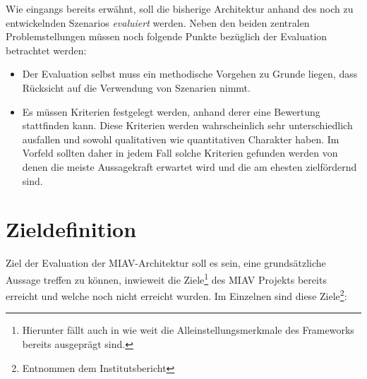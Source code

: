 \documentclass[12pt,headsepline,a4paper,bibtotoc,liststotoc,DIV12,BCOR12mm]{scrartcl}
\begin{document}
  Wie eingangs bereits erwähnt, soll die bisherige Architektur anhand des noch zu entwickelnden Szenarios \emph{evaluiert} werden. Neben den beiden zentralen Problemstellungen müssen noch folgende Punkte bezüglich der Evaluation betrachtet werden:

  \begin{itemize}
    \item Der Evaluation selbst muss ein methodische Vorgehen zu Grunde liegen, dass Rücksicht auf die Verwendung von Szenarien nimmt.
    \item Es müssen Kriterien festgelegt werden, anhand derer eine Bewertung stattfinden kann. Diese Kriterien werden wahrscheinlich sehr unterschiedlich ausfallen und sowohl qualitativen wie quantitativen Charakter haben. Im Vorfeld sollten daher in jedem Fall solche Kriterien gefunden werden von denen die meiste Aussagekraft erwartet wird und die am ehesten zielfördernd sind.
  \end{itemize}


\section{Zieldefinition} %
\label{sec:zieldefinition}

  Ziel der Evaluation der MIAV-Architektur soll es sein, eine grundsätzliche Aussage treffen zu können, inwieweit die Ziele\footnote{Hierunter fällt auch in wie weit die Alleinstellungsmerkmale des Frameworks bereits ausgeprägt sind.} des MIAV Projekts bereits erreicht und welche noch nicht erreicht wurden. Im Einzelnen sind diese Ziele\footnote{Entnommen dem Institutsbericht}:
  
\end{document}
